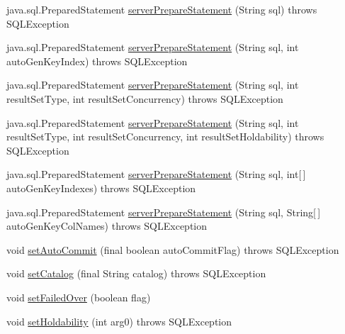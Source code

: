 \begin{DoxyCompactItemize}
\item 
java.\+sql.\+Prepared\+Statement \mbox{\hyperlink{classcom_1_1mysql_1_1cj_1_1jdbc_1_1_connection_impl_ad91b5892ca4cc22ca40b2421171b0078}{server\+Prepare\+Statement}} (String sql)  throws S\+Q\+L\+Exception 
\item 
java.\+sql.\+Prepared\+Statement \mbox{\hyperlink{classcom_1_1mysql_1_1cj_1_1jdbc_1_1_connection_impl_abd651a25d34961e6b9e8b5938f57222f}{server\+Prepare\+Statement}} (String sql, int auto\+Gen\+Key\+Index)  throws S\+Q\+L\+Exception 
\item 
java.\+sql.\+Prepared\+Statement \mbox{\hyperlink{classcom_1_1mysql_1_1cj_1_1jdbc_1_1_connection_impl_a4d739eb2f2ef627fd61b4da1a57c94b5}{server\+Prepare\+Statement}} (String sql, int result\+Set\+Type, int result\+Set\+Concurrency)  throws S\+Q\+L\+Exception 
\item 
java.\+sql.\+Prepared\+Statement \mbox{\hyperlink{classcom_1_1mysql_1_1cj_1_1jdbc_1_1_connection_impl_a993fa4ecbf826575370653501a64d7fb}{server\+Prepare\+Statement}} (String sql, int result\+Set\+Type, int result\+Set\+Concurrency, int result\+Set\+Holdability)  throws S\+Q\+L\+Exception 
\item 
java.\+sql.\+Prepared\+Statement \mbox{\hyperlink{classcom_1_1mysql_1_1cj_1_1jdbc_1_1_connection_impl_a19b32ebaabe6dbd19ce2dd4ca4b3e5eb}{server\+Prepare\+Statement}} (String sql, int\mbox{[}$\,$\mbox{]} auto\+Gen\+Key\+Indexes)  throws S\+Q\+L\+Exception 
\item 
java.\+sql.\+Prepared\+Statement \mbox{\hyperlink{classcom_1_1mysql_1_1cj_1_1jdbc_1_1_connection_impl_ae7caa7907c0b5245c5f8ac2f209abf2a}{server\+Prepare\+Statement}} (String sql, String\mbox{[}$\,$\mbox{]} auto\+Gen\+Key\+Col\+Names)  throws S\+Q\+L\+Exception 
\item 
void \mbox{\hyperlink{classcom_1_1mysql_1_1cj_1_1jdbc_1_1_connection_impl_a53c90790a0e3d5c1ebae0278a15453be}{set\+Auto\+Commit}} (final boolean auto\+Commit\+Flag)  throws S\+Q\+L\+Exception 
\item 
void \mbox{\hyperlink{classcom_1_1mysql_1_1cj_1_1jdbc_1_1_connection_impl_aa496cdf7782256493c7bddd156d9b75d}{set\+Catalog}} (final String catalog)  throws S\+Q\+L\+Exception 
\item 
void \mbox{\hyperlink{classcom_1_1mysql_1_1cj_1_1jdbc_1_1_connection_impl_afef2182754848487fb2e37daea9ff7eb}{set\+Failed\+Over}} (boolean flag)
\item 
void \mbox{\hyperlink{classcom_1_1mysql_1_1cj_1_1jdbc_1_1_connection_impl_a8aa784925793e967a593b4c171a9f13b}{set\+Holdability}} (int arg0)  throws S\+Q\+L\+Exception 

\end{DoxyCompactItemize}
